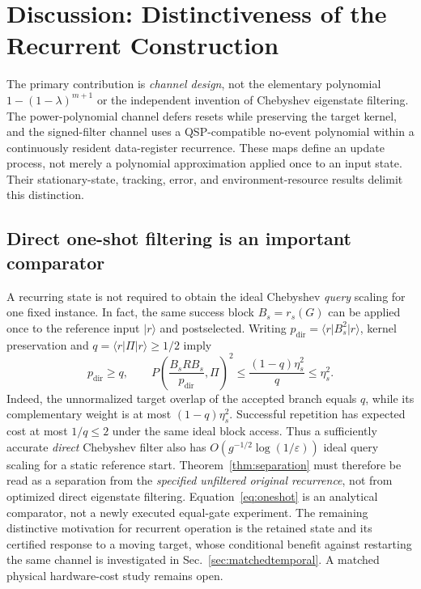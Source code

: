 \documentclass{ieeeaccess}
\newcommand{\ket}[1]{\lvert #1\rangle}\newcommand{\bra}[1]{\langle #1\rvert}
\newcommand{\eps}{\varepsilon}\newcommand{\tr}{\mathsf T}
\begin{document}


\section{Discussion: Distinctiveness of the Recurrent Construction}\label{sec:discussion}
The primary contribution is \emph{channel design}, not the elementary polynomial $1-(1-\lambda)^{m+1}$ or the independent invention of Chebyshev eigenstate filtering. The power-polynomial channel defers resets while preserving the target kernel, and the signed-filter channel uses a QSP-compatible no-event polynomial within a continuously resident data-register recurrence. These maps define an update process, not merely a polynomial approximation applied once to an input state. Their stationary-state, tracking, error, and environment-resource results delimit this distinction.

\subsection{Direct one-shot filtering is an important comparator}
A recurring state is not required to obtain the ideal Chebyshev \emph{query} scaling for one fixed instance. In fact, the same success block $B_s=r_s(G)$ can be applied once to the reference input $\ket r$ and postselected. Writing $p_{\mathrm{dir}}=\bra r B_s^2\ket r$, kernel preservation and $q=\bra r\Pi\ket r\ge1/2$ imply
\begin{equation}\label{eq:oneshot}
 p_{\mathrm{dir}}\ge q,\qquad
 P\!\left(\frac{B_s R B_s}{p_{\mathrm{dir}}},\Pi\right)^2
 \le\frac{(1-q)\eta_s^2}{q}\le\eta_s^2.
\end{equation}
Indeed, the unnormalized target overlap of the accepted branch equals $q$, while its complementary weight is at most $(1-q)\eta_s^2$. Successful repetition has expected cost at most $1/q\le2$ under the same ideal block access. Thus a sufficiently accurate \emph{direct} Chebyshev filter also has $O(g^{-1/2}\log(1/\eps))$ ideal query scaling for a static reference start. Theorem~\ref{thm:separation} must therefore be read as a separation from the \emph{specified unfiltered original recurrence}, not from optimized direct eigenstate filtering. Equation~\eqref{eq:oneshot} is an analytical comparator, not a newly executed equal-gate experiment. The remaining distinctive motivation for recurrent operation is the retained state and its certified response to a moving target, whose conditional benefit against restarting the same channel is investigated in Sec.~\ref{sec:matchedtemporal}. A matched physical hardware-cost study remains open.
\end{document}
